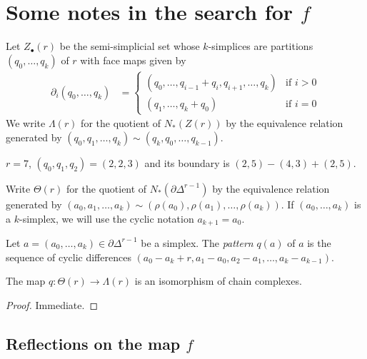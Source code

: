 
\section{Some notes in the search for $f$}

Let $Z_\bullet(r)$ be the semi-simplicial set whose $k$-simplices are partitions $(q_0,\ldots,q_k)$ of $r$ with face maps given by
\begin{align*}
	\partial_i(q_0,\ldots,q_k) &= \begin{cases}
		(q_0,\ldots,q_{i-1}+q_{i},q_{i+1},\ldots,q_k) & \text{if $i>0$} \\
		(q_1,\ldots,q_{k}+q_0) & \text{if $i=0$}
	\end{cases}
\end{align*}
We write $\Lambda(r)$ for the quotient of $N_*(Z(r))$ by the equivalence relation generated by $(q_0,q_1,\ldots,q_k)\sim (q_k,q_0,\ldots,q_{k-1})$.

\begin{example}
	$r=7$, $(q_0,q_1,q_2) = (2,2,3)$ and its boundary is $(2,5)-(4,3)+(2,5)$.
\end{example}

Write $\Theta(r)$ for the quotient of $N_*(\partial \Delta^{r-1})$ by the equivalence relation generated by $(a_0,a_1,\ldots,a_k)\sim (\rho(a_0),\rho(a_1),\ldots,\rho(a_k))$. If $(a_0,\ldots,a_k)$ is a $k$-simplex, we will use the cyclic notation $a_{k+1} = a_0$.

\begin{definition}
	Let $a = (a_0,\ldots,a_k)\in \partial \Delta^{r-1}$ be a simplex. The \emph{pattern} $q(a)$ of $a$ is the sequence of cyclic differences $(a_0-a_k+r,a_1-a_0,a_2-a_1,\ldots,a_k-a_{k-1})$.
\end{definition}

\begin{lemma}
	The map $q\colon \Theta(r)\to \Lambda(r)$ is an isomorphism of chain complexes.
\end{lemma}

\begin{proof}
	Immediate.
\end{proof}

\subsection{Reflections on the map $f$}

